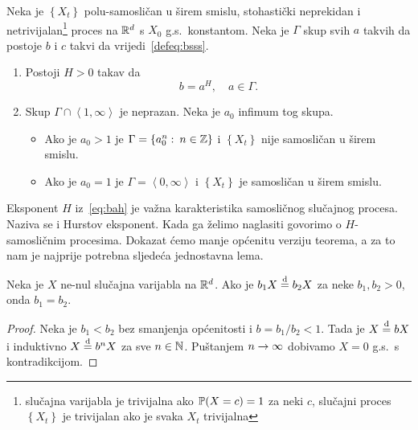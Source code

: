 \documentclass[main.tex]{subfiles}
\begin{document}
\begin{teorem}\label{tm:ss-opci}
	Neka je \( \left\{ X_t \right\} \) polu-samosličan u širem smislu, stohastički neprekidan
	i netrivijalan\footnote{slučajna varijabla je trivijalna ako \( \P(X=c)=1 \) za neki \( c \), slučajni proces \( \left\{ X_t \right\} \) je trivijalan ako je svaka \( X_t \) trivijalna} proces na \( \R^d \) s \( X_0 \) g.s.\ konstantom. Neka je \( \Gamma \) skup svih \( a \) takvih da postoje \( b \) i \( c \) takvi da
	vrijedi~\eqref{defeq:bsss}.
	\begin{enumerate}[label=(\roman*)]
		\item Postoji \( H > 0 \) takav da
		      \begin{equation}\label{eq:bah}
			      b = a^H, \quad a \in \Gamma.
		      \end{equation}
		\item Skup \( \Gamma \cap \left\langle1,\infty\right\rangle\) je neprazan. Neka je \( a_0 \)
		      infimum tog skupa.
		      \begin{itemize}
			      \item Ako je \(a_0 > 1 \) je \( \Gamma = \left\{ a_0^n \st n \in \Z \right\} \)
			            i \( \left\{X_t\right\} \) nije samosličan u širem smislu.
			      \item Ako je \( a_0 = 1 \) je \( \Gamma = \left\langle0,\infty\right\rangle  \)
			            i \( \left\{ X_t \right\} \) je samosličan u širem smislu.
		      \end{itemize}
	\end{enumerate}
\end{teorem}

Eksponent \( H \) iz~\eqref{eq:bah} je važna karakteristika samosličnog
slučajnog procesa. Naziva se i Hurstov eksponent. Kada ga želimo naglasiti
govorimo o \( H \)-samosličnim procesima. Dokazat ćemo manje općenitu verziju teorema,
a za to nam je najprije potrebna sljedeća jednostavna lema.

\begin{lema}\label{lema:ss}
	Neka je \( X \) ne-nul slučajna varijabla na \( \R^d \). Ako je \( b_1X \jpod b_2X \) za
	neke \( b_1, b_2 > 0\), onda \( b_1=b_2 \).
\end{lema}

\begin{proof}
	Neka je \( b_1 < b_2 \) bez smanjenja općenitosti i \( b = b_1/b_2 < 1 \). Tada je
	\( X \jpod bX  \) i induktivno \( X \jpod b^nX \) za sve \( n \in \N \).
	Puštanjem \( n \ub \) dobivamo \( X = 0 \) g.s.\ s kontradikcijom.
\end{proof}
\end{document}
